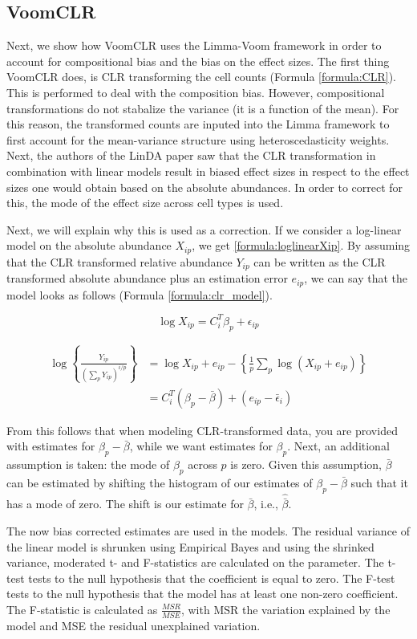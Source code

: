 \subsection{VoomCLR}
Next, we show how VoomCLR uses the Limma-Voom framework in order to account for compositional bias and the bias on the effect sizes.
The first thing VoomCLR does, is CLR transforming the cell counts (Formula \ref{formula:CLR}).
This is performed to deal with the composition bias.
However, compositional transformations do not stabalize the variance (it is a function of the mean).
For this reason, the transformed counts are inputed into the Limma framework to first account for the mean-variance structure using heteroscedasticity weights.
Next, the authors of the LinDA paper saw that the CLR transformation in combination with linear models result in biased effect sizes in respect to the effect sizes one would obtain based on the absolute abundances.
In order to correct for this, the mode of the effect size across cell types is used.

Next, we will explain why this is used as a correction.
If we consider a log-linear model on the absolute abundance $X_{ip}$, we get \ref{formula:loglinearXip}.
By assuming that the CLR transformed relative abundance $Y_{ip}$ can be written as the CLR transformed absolute abundance plus an estimation error $e_{ip}$, we can say that the model looks as follows (Formula \ref{formula:clr_model}).

\begin{equation}
    \log X_{ip} = C_i^T \beta_p + \epsilon_{ip}
    \label{formula:loglinearXip}
\end{equation}

\begin{align}
    \log \left\{\frac{Y_{ip}}{\left(\sum_p Y_{ip}\right)^{i/p}}\right\} &= \log X_{ip} + e_{ip} - \left\{\frac{1}{p} \sum_p \log (X_{ip} + e_{ip})\right\} \\
        &= C_i^T (\beta_p - \bar{\beta}) + (e_{ip} - \bar{\epsilon}_i)
    \label{formula:clr_model}
\end{align}

From this follows that when modeling CLR-transformed data, you are provided with estimates for $\beta_p - \bar{\beta}$, while we want estimates for $\beta_p$.
Next, an additional assumption is taken: the mode of $\beta_p$ across $p$ is zero.
Given this assumption, $\bar{\beta}$ can be estimated by shifting the histogram of our estimates of $\beta_p - \bar{\beta}$ such that it has a mode of zero.
The shift is our estimate for $\bar{\beta}$, i.e., $\hat{\bar{\beta}}$.

The now bias corrected estimates are used in the models.
The residual variance of the linear model is shrunken using Empirical Bayes and using the shrinked variance, moderated t- and F-statistics are calculated on the parameter.
The t-test tests to the null hypothesis that the coefficient is equal to zero.
The F-test tests to the null hypothesis that the model has at least one non-zero coefficient.
The F-statistic is calculated as $\frac{MSR}{MSE}$, with MSR the variation explained by the model and MSE the residual unexplained variation.
